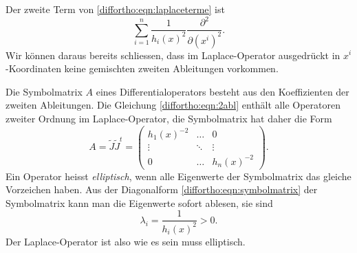 Der zweite Term von
\eqref{diffortho:eqn:laplaceterme}
ist
\begin{equation}
\sum_{i=1}^n \frac{1}{h_i(x)^2}\frac{\partial^2}{\partial (x^i)^2}.
\label{diffortho:eqn:2abl}
\end{equation}
Wir können daraus bereits schliessen, dass im Laplace-Operator
ausgedrückt in $x^i$-Koordinaten keine gemischten zweiten Ableitungen
vorkommen.

Die Symbolmatrix $A$ eines Differentialoperators besteht aus den
Koeffizienten der zweiten Ableitungen.
Die Gleichung \eqref{diffortho:eqn:2abl} enthält alle Operatoren zweiter
Ordnung im Laplace-Operator, die Symbolmatrix hat daher die Form
\begin{equation}
A
=
\tilde{J}\tilde{J}^t
=
\begin{pmatrix}
h_1(x)^{-2} & \dots  & 0          \\
\vdots      & \ddots & \vdots     \\[-2pt]
0           & \dots  & h_n(x)^{-2}
\end{pmatrix}.
\label{diffortho:eqn:symbolmatrix}
\end{equation}
Ein Operator heisst {\em elliptisch}, wenn alle Eigenwerte der
Symbolmatrix das gleiche Vorzeichen haben.
Aus der Diagonalform \eqref{diffortho:eqn:symbolmatrix} der Symbolmatrix
kann man die Eigenwerte sofort ablesen, sie sind
\[
\lambda_i
=
\frac{1}{h_i(x)^2}
>
0.
\]
Der Laplace-Operator ist also wie es sein muss elliptisch.




